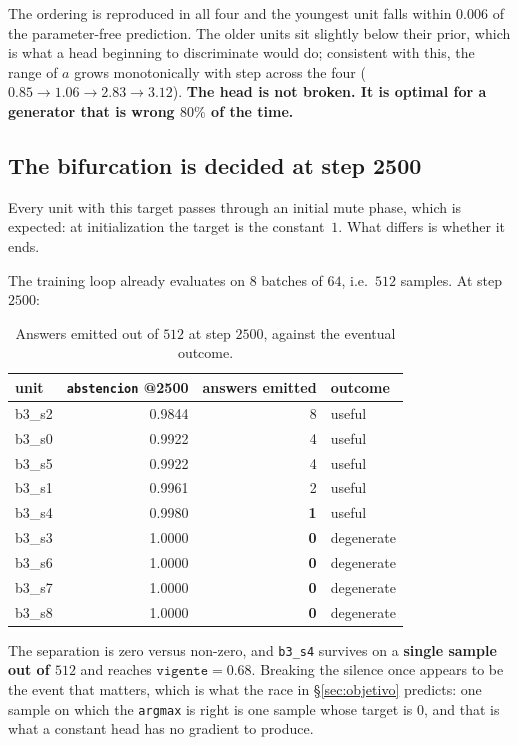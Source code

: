 \documentclass[11pt]{article}
\begin{document}
The ordering is reproduced in all four and the youngest unit falls within $0.006$ of the
parameter-free prediction. The older units sit slightly below their prior, which is what a head
beginning to discriminate would do; consistent with this, the range of $a$ grows monotonically with
step across the four ($0.85 \to 1.06 \to 2.83 \to 3.12$). \textbf{The head is not broken. It is
optimal for a generator that is wrong $80\%$ of the time.}

\subsection{The bifurcation is decided at step 2500}
\label{sec:bifurcacion}

Every unit with this target passes through an initial mute phase, which is expected: at
initialization the target is the constant~$1$. What differs is whether it ends.

The training loop already evaluates on $8$ batches of $64$, i.e.\ $512$ samples. At step $2500$:

\begin{table}[h]
\centering
\caption{Answers emitted out of $512$ at step $2500$, against the eventual outcome.}
\begin{tabular}{lrrl}
\toprule
unit & \texttt{abstencion} @2500 & answers emitted & outcome \\
\midrule
b3\_s2 & 0.9844 & 8 & useful \\
b3\_s0 & 0.9922 & 4 & useful \\
b3\_s5 & 0.9922 & 4 & useful \\
b3\_s1 & 0.9961 & 2 & useful \\
b3\_s4 & 0.9980 & \textbf{1} & useful \\
\midrule
b3\_s3 & 1.0000 & \textbf{0} & degenerate \\
b3\_s6 & 1.0000 & \textbf{0} & degenerate \\
b3\_s7 & 1.0000 & \textbf{0} & degenerate \\
b3\_s8 & 1.0000 & \textbf{0} & degenerate \\
\bottomrule
\end{tabular}
\label{tab:bifurcacion}
\end{table}

The separation is zero versus non-zero, and \texttt{b3\_s4} survives on a \textbf{single sample out
of $512$} and reaches $\texttt{vigente} = 0.68$. Breaking the silence once appears to be the event
that matters, which is what the race in \S\ref{sec:objetivo} predicts: one sample on which the
\texttt{argmax} is right is one sample whose target is $0$, and that is what a constant head has no
gradient to produce.
\end{document}
